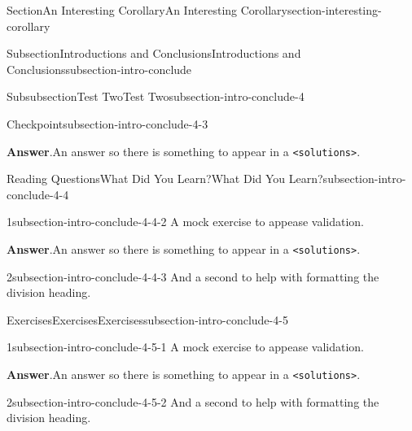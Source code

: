 \documentclass[twoside,10pt,]{article}
\newcommand{\blocktitlefont}{\relax}
\newcommand{\mono}[1]{\texttt{#1}}
\numberwithin{equation}{section}
\begin{document}
\begin{sectionptx}{Section}{An Interesting Corollary}{}{An Interesting Corollary}{}{}{section-interesting-corollary}
\begin{subsectionptx}{Subsection}{Introductions and Conclusions}{}{Introductions and Conclusions}{}{}{subsection-intro-conclude}
\begin{subsubsectionptx}{Subsubsection}{Test Two}{}{Test Two}{}{}{subsection-intro-conclude-4}
\begin{inlineexercise}{Checkpoint}{}{subsection-intro-conclude-4-3}
\par\smallskip%
\noindent\textbf{\blocktitlefont Answer}.\hypertarget{subsection-intro-conclude-4-3-2}{}\quad{}An answer so there is something to appear in a \mono{<solutions>}.%
\end{inlineexercise}%
%
%
\typeout{************************************************}
\typeout{************************************************}
%
\begin{reading-questions-paragraph-numberless}{Reading Questions}{What Did You Learn?}{}{What Did You Learn?}{}{}{subsection-intro-conclude-4-4}
\begin{divisionexercise}{1}{}{}{subsection-intro-conclude-4-4-2}%
A mock exercise to appease validation.%
\par\smallskip%
\noindent\textbf{\blocktitlefont Answer}.\hypertarget{subsection-intro-conclude-4-4-2-2}{}\quad{}An answer so there is something to appear in a \mono{<solutions>}.%
\end{divisionexercise}%
\begin{divisionexercise}{2}{}{}{subsection-intro-conclude-4-4-3}%
And a second to help with formatting the division heading.%
\end{divisionexercise}%
\end{reading-questions-paragraph-numberless}
%
%
\typeout{************************************************}
\typeout{************************************************}
%
\begin{exercises-paragraph-numberless}{Exercises}{Exercises}{}{Exercises}{}{}{subsection-intro-conclude-4-5}
\begin{divisionexercise}{1}{}{}{subsection-intro-conclude-4-5-1}%
A mock exercise to appease validation.%
\par\smallskip%
\noindent\textbf{\blocktitlefont Answer}.\hypertarget{subsection-intro-conclude-4-5-1-2}{}\quad{}An answer so there is something to appear in a \mono{<solutions>}.%
\end{divisionexercise}%
\begin{divisionexercise}{2}{}{}{subsection-intro-conclude-4-5-2}%
And a second to help with formatting the division heading.%
\end{divisionexercise}%
\end{exercises-paragraph-numberless}
\end{subsubsectionptx}
%
%
\typeout{************************************************}

\end{subsectionptx}
\end{sectionptx}
\end{document}
